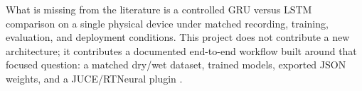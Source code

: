 What is missing from the literature is a controlled GRU versus LSTM comparison on a single physical device under matched recording, training, evaluation, and deployment conditions. This project does not contribute a new architecture; it contributes a documented end-to-end workflow built around that focused question: a matched dry/wet dataset, trained models, exported JSON weights, and a JUCE/RTNeural plugin \cite{candy_practice-based_2018,batty_research_2024}.
